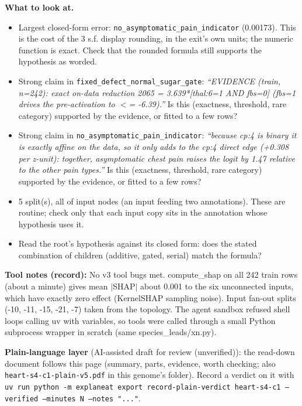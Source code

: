 \documentclass[a4paper,11pt]{article}
\begin{document}
\textbf{What to look at.}
\begin{itemize}
\item Largest closed-form error: \texttt{no\_\allowbreak{}asymptomatic\_\allowbreak{}pain\_\allowbreak{}indicator} (0.00173). This is the cost of the 3 s.f. display rounding, in the exit's own units; the numeric function is exact. Check that the rounded formula still supports the hypothesis as worded.
\item Strong claim in \texttt{fixed\_\allowbreak{}defect\_\allowbreak{}normal\_\allowbreak{}sugar\_\allowbreak{}gate}: \emph{``EVIDENCE (train, n=242): exact on-data reduction 2065 = 3.639*[thal:6=1 AND fbs=0] (fbs=1 drives the pre-activation to $<$= -6.39).''} Is this (exactness, threshold, rare category) supported by the evidence, or fitted to a few rows?
\item Strong claim in \texttt{no\_\allowbreak{}asymptomatic\_\allowbreak{}pain\_\allowbreak{}indicator}: \emph{``because cp:4 is binary it is exactly affine on the data, so it only adds to the cp:4 direct edge (+0.308 per z-unit): together, asymptomatic chest pain raises the logit by 1.47 relative to the other pain types.''} Is this (exactness, threshold, rare category) supported by the evidence, or fitted to a few rows?
\item 5 split(s), all of input nodes (an input feeding two annotations). These are routine; check only that each input copy sits in the annotation whose hypothesis uses it.
\item Read the root's hypothesis against its closed form: does the stated combination of children (additive, gated, serial) match the formula?
\end{itemize}
\textbf{Tool notes (record):} No v3 tool bugs met. compute\_\allowbreak{}shap on all 242 train rows (about a minute) gives mean $|$SHAP$|$ about 0.001 to the six unconnected inputs, which have exactly zero effect (KernelSHAP sampling noise). Input fan-out splits (-10, -11, -15, -21, -7) taken from the topology. The agent sandbox refused shell loops calling uv with variables, so tools were called through a small Python subprocess wrapper in scratch (same species\_\allowbreak{}leads/\allowbreak{}xn.py)\allowbreak{}.

\textbf{Plain-language layer} (AI-assisted draft for review (unverified)): the read-down document follows this page (summary, parts, evidence, worth checking; also \texttt{heart-s4-c1-plain-v5.pdf} in this genome's folder). Record a verdict on it with \texttt{uv run python -m explaneat export record-plain-verdict heart-s4-c1 --verified --minutes N --notes "..."}.
\end{document}
